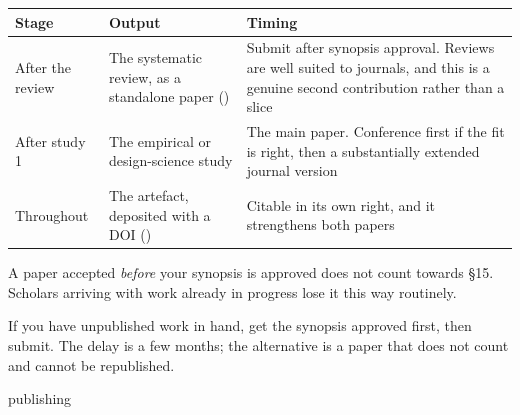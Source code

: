 \begin{center}
\small
\begin{tabular}{@{}L{3.0cm}L{5.4cm}L{5.5cm}@{}}
\toprule
\textbf{Stage} & \textbf{Output} & \textbf{Timing} \\
\midrule
After the review
  & The systematic review, as a standalone paper ()
  & Submit after synopsis approval. Reviews are well suited to journals, and
    this is a genuine second contribution rather than a slice \\
After study 1
  & The empirical or design-science study
  & The main paper. Conference first if the fit is right, then a substantially
    extended journal version \\
Throughout
  & The artefact, deposited with a DOI ()
  & Citable in its own right, and it strengthens both papers \\
\bottomrule
\end{tabular}
\end{center}

\begin{alertbox}
A paper accepted \emph{before} your synopsis is approved does not count towards
\S15. Scholars arriving with work already in progress lose it this way
routinely.

\medskip
If you have unpublished work in hand, get the synopsis approved first, then
submit. The delay is a few months; the alternative is a paper that does not
count and cannot be republished.
\end{alertbox}

\begin{traditions}{publishing}
\end{traditions}

